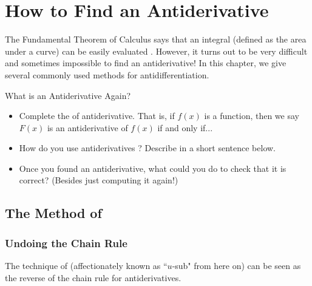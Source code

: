 
\chapter{How to Find an Antiderivative }

The Fundamental Theorem of Calculus says that an integral (defined as the area under a curve) can be easily evaluated .  However, it turns out to be very difficult and sometimes impossible to find an antiderivative!  In this chapter, we give several commonly used methods for antidifferentiation.

\begin{exercise}{What is an Antiderivative Again? \Coffeecup }
\begin{itemize}
\item Complete the  of antiderivative.  That is, if $f(x)$ is a function, then we say $F(x)$ is an antiderivative of $f(x)$ if and only if... 

\item How do you use antiderivatives ?  Describe in a short sentence below. 

\vspace*{.2in}

\item Once you found an antiderivative, what could you do to check that it is correct? (Besides just computing it again!)
\end{itemize}
\end{exercise}

\section{The Method of }
\subsection{Undoing the Chain Rule}\label{undo}
The technique of  (affectionately known as ``$u$-sub" from here on) can be seen as the reverse of the chain rule for antiderivatives.

